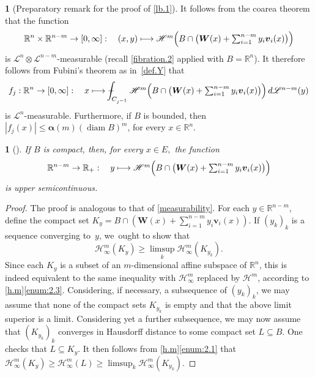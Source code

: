 \documentclass[11pt]{article}
\newcounter{cdrthm}[section]
\theoremstyle{definition}
\theoremstyle{jepanonymous}
\newtheorem{jepempty}[cdrthm]{}
\newenvironment{enonce}[2][remark]{\begin{jepempty}[#2]}{\end{jepempty}}
\theoremstyle{plain}
\newcommand\mto{\mathchoice{\longmapsto}{\mapsto}{\mapsto}{\mapsto}}
\newenvironment{Empty}[2][\null]{%
\begin{enonce}[remark]{#1}#2}
{\end{enonce}}
\newcommand{\R}{\mathbb{R}}
\newcommand{\Rn}{\R^n}
\newcommand{\calH}{\mathscr{H}}
\newcommand{\calL}{\mathscr{L}}
\newcommand{\balpha}{\boldsymbol{\alpha}}
\newcommand{\bW}{{\boldsymbol{W}}}
\newcommand{\bv}{{\boldsymbol{v}}}
\DeclareMathOperator{\rmdiam}{\mathrm{diam}}
\def\Xint#1{\mathchoice
{\XXint\displaystyle\textstyle{#1}}{\XXint\textstyle\scriptstyle{#1}}{\XXint\scriptstyle\scriptscriptstyle{#1}}{\XXint\scriptscriptstyle
\scriptscriptstyle{#1}}\!\int}
\def\XXint#1#2#3{{\setbox0=\hbox{$#1{#2#3}{\int}$}
\vcenter{\hbox{$#2#3$}}\kern-.5\wd0}}
\def\dashint{\Xint-}
\let\subset\subseteq
\begin{document}
\begin{Empty}[Preparatory remark for the proof of \ref{lb.1}]
\label{rem.1}
It follows from the coarea theorem that the function
\begin{equation*}
\Rn \times \R^{n-m} \to [0,\infty]:\quad (x,y) \mto \textstyle\calH^m \Bigl(B \cap \bigl(\bW(x) + \sum_{i=1}^{n-m} y_i \bv_i(x) \bigr) \Bigr)
\end{equation*}
is $\calL^n \otimes \calL^{n-m}$-measurable (recall \ref{fibration.2} applied with $B = \Rn$).
It therefore follows from Fubini's theorem as in~\ref{def.Y} that
\begin{equation*}
f_j: \Rn \to [0,\infty]:\quad x \mto \dashint_{C_{j^{-1}}} \textstyle\calH^m \Bigl(B \cap \bigl(\bW(x) + \sum_{i=1}^{n-m} y_i \bv_i(x) \bigr) \Bigr) \,d\calL^{n-m}(y)
\end{equation*}
is $\calL^n$-measurable.
Furthermore, if $B$ is bounded, then $|f_j(x)| \leq \balpha(m) (\rmdiam B)^m$, for every $x \in \Rn$.
\end{Empty}

\begin{Empty}[]
\label{usc}
{\it
If $B$ is compact, then, for every $x \in E,$ the function
\begin{equation*}
\R^{n-m} \to \R_+:\quad y \mto \textstyle\calH^m \Bigl(B \cap \bigl(\bW(x) + \sum_{i=1}^{n-m} y_i \bv_i(x) \bigr) \Bigr)
\end{equation*}
is upper semicontinuous.
}
\end{Empty}

\begin{proof}
The proof is analogous to that of \ref{measurability}.
For each $y \in \R^{n-m}$, define the compact set $K_y \!=\! B \cap(\bW(x) + \sum_{i=1}^{n-m} y_i \bv_i(x))$.
If $(y_k)_k$ is a sequence converging to~$y$, we~ought to show that
\begin{equation*}
\calH^m_\infty(K_y) \geq \limsup_k \calH^m_\infty(K_{y_k}).
\end{equation*}
Since each $K_y$ is a subset of an $m$-dimensional affine subspace of $\Rn$, this is indeed equivalent to the same inequality with $\calH^m_\infty$ replaced by $\calH^m$, according to \ref{h.m}\eqref{enum:2.3}.
Considering, if necessary, a subsequence of $(y_k)_k$, we may assume that none of the compact sets $K_{y_k}$ is empty and that the above limit superior is a limit.
Considering yet a further subsequence, we may now assume that $(K_{y_k})_k$ converges in Hausdorff distance to some compact set $L \subset B$.
One checks that $L \subset K_y$.
It then follows from \ref{h.m}\eqref{enum:2.1} that $\calH^m_\infty \left(K_y\right) \geq \calH^m_\infty (L) \geq \limsup_k \calH^m_\infty \left(K_{y_k} \right)$.
\end{proof}
\end{document}
